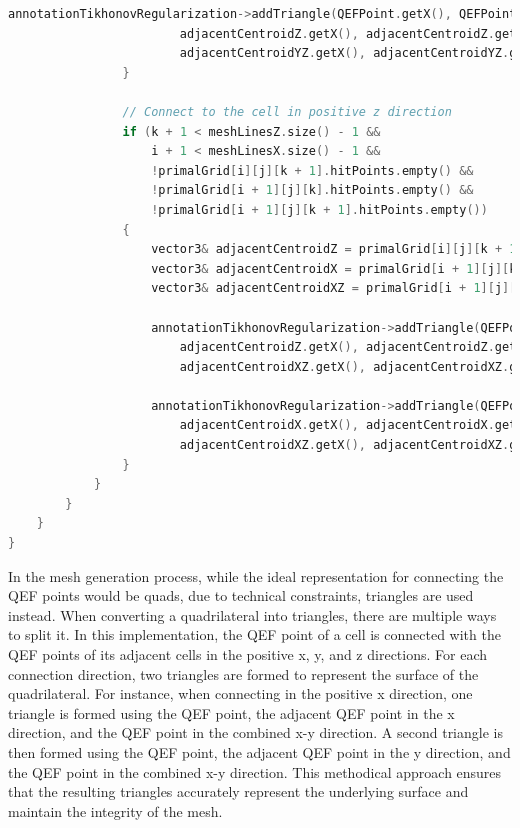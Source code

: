 \begin{lstlisting}[language=C++, caption=Mesh Generation Using QEF Points, label=lst:meshGeneration]
					annotationTikhonovRegularization->addTriangle(QEFPoint.getX(), QEFPoint.getY(), QEFPoint.getZ(),
						adjacentCentroidZ.getX(), adjacentCentroidZ.getY(), adjacentCentroidZ.getZ(),
						adjacentCentroidYZ.getX(), adjacentCentroidYZ.getY(), adjacentCentroidYZ.getZ(), 0.0, 0.0, 0.6);
				}

				// Connect to the cell in positive z direction
				if (k + 1 < meshLinesZ.size() - 1 &&
					i + 1 < meshLinesX.size() - 1 &&
					!primalGrid[i][j][k + 1].hitPoints.empty() &&
					!primalGrid[i + 1][j][k].hitPoints.empty() &&
					!primalGrid[i + 1][j][k + 1].hitPoints.empty())
				{
					vector3& adjacentCentroidZ = primalGrid[i][j][k + 1].QEFPoint;
					vector3& adjacentCentroidX = primalGrid[i + 1][j][k].QEFPoint;
					vector3& adjacentCentroidXZ = primalGrid[i + 1][j][k + 1].QEFPoint;

					annotationTikhonovRegularization->addTriangle(QEFPoint.getX(), QEFPoint.getY(), QEFPoint.getZ(),
						adjacentCentroidZ.getX(), adjacentCentroidZ.getY(), adjacentCentroidZ.getZ(),
						adjacentCentroidXZ.getX(), adjacentCentroidXZ.getY(), adjacentCentroidXZ.getZ(), 0.0, 0.0, 0.6);

					annotationTikhonovRegularization->addTriangle(QEFPoint.getX(), QEFPoint.getY(), QEFPoint.getZ(),
						adjacentCentroidX.getX(), adjacentCentroidX.getY(), adjacentCentroidX.getZ(),
						adjacentCentroidXZ.getX(), adjacentCentroidXZ.getY(), adjacentCentroidXZ.getZ(), 0.0, 0.0, 0.6);
				}
			}
		}
	}
}
\end{lstlisting}
\vspace{2mm}

In the mesh generation process, while the ideal representation for connecting the QEF points would be quads, due to technical constraints, triangles are used instead. When converting a quadrilateral into triangles, there are multiple ways to split it. In this implementation, the QEF point of a cell is connected with the QEF points of its adjacent cells in the positive x, y, and z directions. For each connection direction, two triangles are formed to represent the surface of the quadrilateral. For instance, when connecting in the positive x direction, one triangle is formed using the QEF point, the adjacent QEF point in the x direction, and the QEF point in the combined x-y direction. A second triangle is then formed using the QEF point, the adjacent QEF point in the y direction, and the QEF point in the combined x-y direction. This methodical approach ensures that the resulting triangles accurately represent the underlying surface and maintain the integrity of the mesh.

